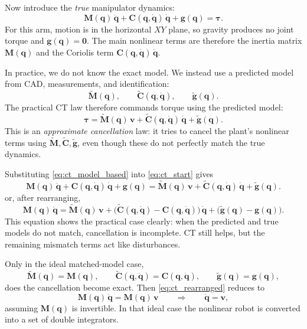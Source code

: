 \documentclass[11pt,a4paper]{article}
\newcommand{\vq}{\bm{q}}
\newcommand{\vqd}{\dot{\bm{q}}}
\newcommand{\vqdd}{\ddot{\bm{q}}}
\newcommand{\vtau}{\bm{\tau}}
\newcommand{\M}{\bm{M}}
\newcommand{\Cor}{\bm{C}}
\newcommand{\vg}{\bm{g}}
\begin{document}
Now introduce the \emph{true} manipulator dynamics:
\begin{equation}
  \M(\vq)\,\vqdd + \Cor(\vq,\vqd)\,\vqd + \vg(\vq) = \vtau.
  \label{eq:ct_start}
\end{equation}
For this arm, motion is in the horizontal $XY$ plane, so gravity produces no
joint torque and $\vg(\vq)=\mathbf{0}$.  The main nonlinear terms are therefore
the inertia matrix $\M(\vq)$ and the Coriolis term $\Cor(\vq,\vqd)\,\vqd$.

In practice, we do not know the exact model.  We instead use a predicted model
from CAD, measurements, and identification:
\begin{equation}
  \tilde{\M}(\vq), \qquad \tilde{\Cor}(\vq,\vqd), \qquad \tilde{\vg}(\vq).
\end{equation}
The practical CT law therefore commands torque using the predicted model:
\begin{equation}
  \vtau = \tilde{\M}(\vq)\,\bm{v}
        + \tilde{\Cor}(\vq,\vqd)\,\vqd
        + \tilde{\vg}(\vq).
  \label{eq:ct_model_based}
\end{equation}
This is an \emph{approximate cancellation} law: it tries to cancel the plant's
nonlinear terms using $\tilde{\M}, \tilde{\Cor}, \tilde{\vg}$, even though these
do not perfectly match the true dynamics.

Substituting \eqref{eq:ct_model_based} into \eqref{eq:ct_start} gives
\begin{equation}
  \M(\vq)\,\vqdd + \Cor(\vq,\vqd)\,\vqd + \vg(\vq)
  = \tilde{\M}(\vq)\,\bm{v} + \tilde{\Cor}(\vq,\vqd)\,\vqd + \tilde{\vg}(\vq).
  \label{eq:ct_substituted}
\end{equation}
or, after rearranging,
\begin{equation}
  \M(\vq)\,\vqdd
  = \tilde{\M}(\vq)\,\bm{v}
  + \bigl(\tilde{\Cor}(\vq,\vqd)-\Cor(\vq,\vqd)\bigr)\,\vqd
  + \bigl(\tilde{\vg}(\vq)-\vg(\vq)\bigr).
  \label{eq:ct_rearranged}
\end{equation}
This equation shows the practical case clearly: when the predicted and true
models do not match, cancellation is incomplete.  CT still helps, but the
remaining mismatch terms act like disturbances.

Only in the ideal matched-model case,
\begin{equation}
  \tilde{\M}(\vq)=\M(\vq), \qquad
  \tilde{\Cor}(\vq,\vqd)=\Cor(\vq,\vqd), \qquad
  \tilde{\vg}(\vq)=\vg(\vq),
  \label{eq:ct_exact_model}
\end{equation}
does the cancellation become exact.  Then \eqref{eq:ct_rearranged} reduces to
\begin{equation}
  \M(\vq)\,\vqdd = \M(\vq)\,\bm{v}
  \qquad \Longrightarrow \qquad
  \vqdd = \bm{v},
  \label{eq:ct_double_integrator}
\end{equation}
assuming $\M(\vq)$ is invertible.  In that ideal case the nonlinear robot is
converted into a set of double integrators.
\end{document}

